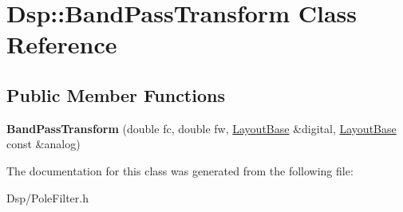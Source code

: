 \hypertarget{classDsp_1_1BandPassTransform}{\section{Dsp\-:\-:Band\-Pass\-Transform Class Reference}
\label{classDsp_1_1BandPassTransform}
}
\subsection*{Public Member Functions}
\begin{DoxyCompactItemize}
\item 
\hypertarget{classDsp_1_1BandPassTransform_a5f99c90339bbf14f46d86dea4731b74e}{{\bfseries Band\-Pass\-Transform} (double fc, double fw, \hyperlink{classDsp_1_1LayoutBase}{Layout\-Base} \&digital, \hyperlink{classDsp_1_1LayoutBase}{Layout\-Base} const \&analog)}\label{classDsp_1_1BandPassTransform_a5f99c90339bbf14f46d86dea4731b74e}

\end{DoxyCompactItemize}


The documentation for this class was generated from the following file\-:\begin{DoxyCompactItemize}
\item 
Dsp/Pole\-Filter.\-h\end{DoxyCompactItemize}
